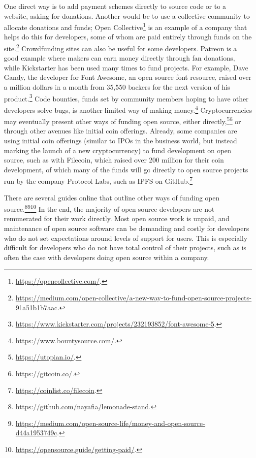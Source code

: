 One direct way is to add payment schemes directly to source code or to a website, asking for donations. Another would be to use a collective community to allocate donations and funds; Open Collective\footnote{\href{https://opencollective.com/}{https://opencollective.com/}. } is an example of a company that helps do this for developers, some of whom are paid entirely through funds on the site.\footnote{\href{https://medium.com/open-collective/a-new-way-to-fund-open-source-projects-91a51b1b7aac}{https://medium.com/open-collective/a-new-way-to-fund-open-source-projects-91a51b1b7aac}. } Crowdfunding sites can also be useful for some developers. Patreon is a good example where makers can earn money directly through fan donations, while Kickstarter has been used many times to fund projects. For example, Dave Gandy, the developer for Font Awesome, an open source font resource, raised over a million dollars in a month from 35,550 backers for the next version of his product.\footnote{\href{https://www.kickstarter.com/projects/232193852/font-awesome-5}{https://www.kickstarter.com/projects/232193852/font-awesome-5}. } Code bounties, funds set by community members hoping to have other developers solve bugs, is another limited way of making money.\footnote{\href{https://www.bountysource.com/}{https://www.bountysource.com/}. } Cryptocurrencies may eventually present other ways of funding open source, either directly,\footnote{\href{https://utopian.io/}{https://utopian.io/}. }\footnote{\href{https://gitcoin.co/}{https://gitcoin.co/}. } or through other avenues like initial coin offerings. Already, some companies are using initial coin offerings (similar to IPOs in the business world, but instead marking the launch of a new cryptocurrency) to fund development on open source, such as with Filecoin, which raised over 200 million for their coin development, of which many of the funds will go directly to open source projects run by the company Protocol Labs, such as IPFS \citep{benet2014ipfs} on GitHub.\footnote{\href{https://coinlist.co/filecoin}{https://coinlist.co/filecoin}. }

There are several guides online that outline other ways of funding open source.\footnote{\href{https://github.com/nayafia/lemonade-stand}{https://github.com/nayafia/lemonade-stand}. }\footnote{\href{https://medium.com/open-source-life/money-and-open-source-d44a1953749c}{https://medium.com/open-source-life/money-and-open-source-d44a1953749c}. }\footnote{\href{https://opensource.guide/getting-paid/}{https://opensource.guide/getting-paid/}. } In the end, the majority of open source developers are not remunerated for their work directly. Most open source work is unpaid, and maintenance of open source software can be demanding and costly for developers who do not set expectations around levels of support for users. This is especially difficult for developers who do not have total control of their projects, such as is often the case with developers doing open source within a company.

